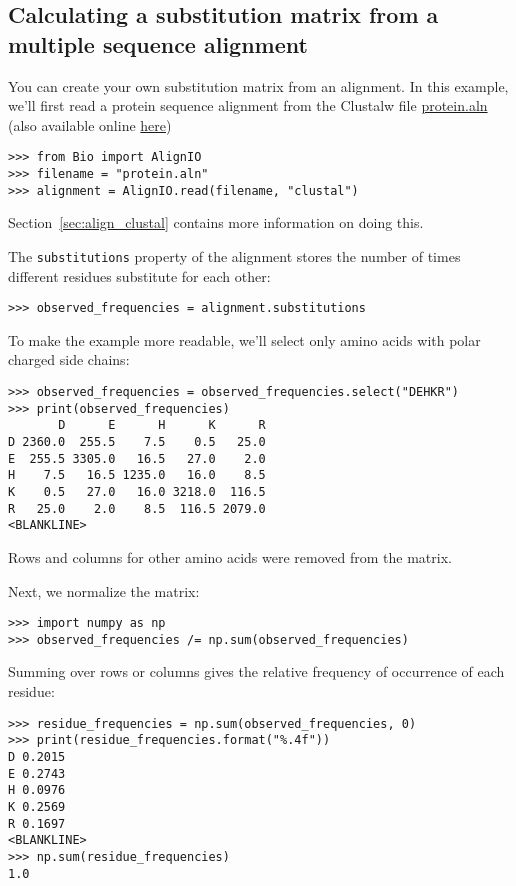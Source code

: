 \subsection{Calculating a substitution matrix from a multiple sequence alignment}
\label{sec:subs_mat_ex}

You can create your own substitution matrix from an alignment.  In this
example, we'll first read a protein sequence alignment from the Clustalw file
\href{examples/protein.aln}{protein.aln} (also available online
\href{https://raw.githubusercontent.com/biopython/biopython/master/Doc/examples/protein.aln}{here})

\begin{verbatim}
>>> from Bio import AlignIO
>>> filename = "protein.aln"
>>> alignment = AlignIO.read(filename, "clustal")
\end{verbatim}

Section~\ref{sec:align_clustal} contains more information on doing this.

The \verb+substitutions+ property of the alignment stores the number of times
different residues substitute for each other:
\begin{verbatim}
>>> observed_frequencies = alignment.substitutions
\end{verbatim}

To make the example more readable, we'll select only amino acids with polar charged side chains:

\begin{verbatim}
>>> observed_frequencies = observed_frequencies.select("DEHKR")
>>> print(observed_frequencies)
       D      E      H      K      R
D 2360.0  255.5    7.5    0.5   25.0
E  255.5 3305.0   16.5   27.0    2.0
H    7.5   16.5 1235.0   16.0    8.5
K    0.5   27.0   16.0 3218.0  116.5
R   25.0    2.0    8.5  116.5 2079.0
<BLANKLINE>
\end{verbatim}
Rows and columns for other amino acids were removed from the matrix.

Next, we normalize the matrix:
\begin{verbatim}
>>> import numpy as np
>>> observed_frequencies /= np.sum(observed_frequencies)
\end{verbatim}

Summing over rows or columns gives the relative frequency of occurrence of
each residue:
\begin{verbatim}
>>> residue_frequencies = np.sum(observed_frequencies, 0)
>>> print(residue_frequencies.format("%.4f"))
D 0.2015
E 0.2743
H 0.0976
K 0.2569
R 0.1697
<BLANKLINE>
>>> np.sum(residue_frequencies)
1.0
\end{verbatim}

